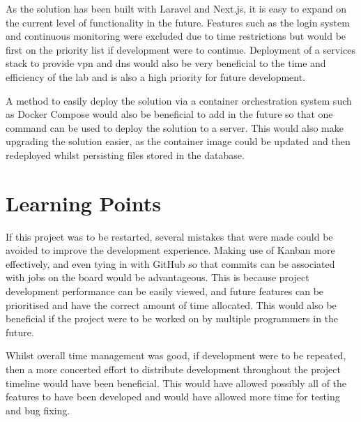 As the solution has been built with Laravel and Next.js, it is easy to expand on the current level of functionality in the future. Features such as the login system and continuous monitoring were excluded due to time restrictions but would be first on the priority list if development were to continue. Deployment of a services stack to provide \gls{vpn} and \gls{dns} would also be very beneficial to the time and efficiency of the lab and is also a high priority for future development.

A method to easily deploy the solution via a container orchestration system such as Docker Compose would also be beneficial to add in the future so that one command can be used to deploy the solution to a server. This would also make upgrading the solution easier, as the container image could be updated and then redeployed whilst persisting files stored in the database.

\section{Learning Points}
\label{sec:learning-points}
If this project was to be restarted, several
mistakes that were made could be avoided to improve the development experience.
Making use of Kanban more effectively, and even tying in with GitHub so that
commits can be associated with jobs on the board would be advantageous. This is
because project development performance can be easily viewed, and future
features can be prioritised and have the correct amount of time allocated. This would also be beneficial if the project were to be worked on by multiple programmers in the future.

Whilst overall time management was good, if development were to be repeated, then a more concerted effort to distribute development throughout the project timeline would have been beneficial. This would have allowed possibly all of the features to have been developed and would have allowed more time for testing and bug fixing.